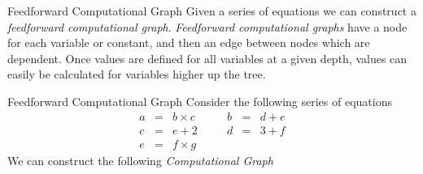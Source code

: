 \documentclass[11pt,a4paper]{article}
\begin{document}
\begin{definition}{Feedforward Computational Graph}
  Given a series of equations we can construct a \textit{feedforward computational graph}. \textit{Feedforward computational graphs} have a node for each variable or constant, and then an edge between nodes which are dependent. Once values are defined for all variables at a given depth, values can easily be calculated for variables higher up the tree.
\end{definition}

\begin{example}{Feedforward Computational Graph}
  Consider the following series of equations
  \[\begin{array}{rclcrcl}
    a&=&b\times c&\quad&b&=&d+e\\
    c&=&e+2&&d&=&3+f\\
    e&=&f\times g
  \end{array}\]
  We can construct the following \textit{Computational Graph}
  \begin{center}\end{center}
\end{example}
\end{document}
